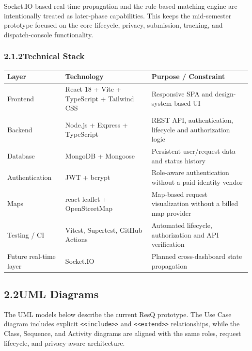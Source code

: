 \documentclass[11pt,a4paper]{article}
\begin{document}
Socket.IO-based real-time propagation and the rule-based matching engine are intentionally treated as later-phase capabilities. This keeps the mid-semester prototype focused on the core lifecycle, privacy, submission, tracking, and dispatch-console functionality.

\subsubsection{2.1.2\quad Technical Stack}

\renewcommand{\arraystretch}{1.25}
\begin{tabularx}{\textwidth}{@{}p{1.2in}p{1.8in}X@{}}
\toprule
\textbf{Layer} & \textbf{Technology} & \textbf{Purpose / Constraint}\\
\midrule
Frontend & React 18 + Vite + TypeScript + Tailwind CSS & Responsive SPA and design-system-based UI\\
Backend & Node.js + Express + TypeScript & REST API, authentication, lifecycle and authorization logic\\
Database & MongoDB + Mongoose & Persistent user/request data and status history\\
Authentication & JWT + bcrypt & Role-aware authentication without a paid identity vendor\\
Maps & react-leaflet + OpenStreetMap & Map-based request visualization without a billed map provider\\
Testing / CI & Vitest, Supertest, GitHub Actions & Automated lifecycle, authorization and API verification\\
Future real-time layer & Socket.IO & Planned cross-dashboard state propagation\\
\bottomrule
\end{tabularx}
\renewcommand{\arraystretch}{1}
\newpage
\subsection{2.2\quad UML Diagrams}

The UML models below describe the current ResQ prototype. The Use Case diagram includes explicit \texttt{<<include>>} and \texttt{<<extend>>} relationships, while the Class, Sequence, and Activity diagrams are aligned with the same roles, request lifecycle, and privacy-aware architecture.



\end{document}
